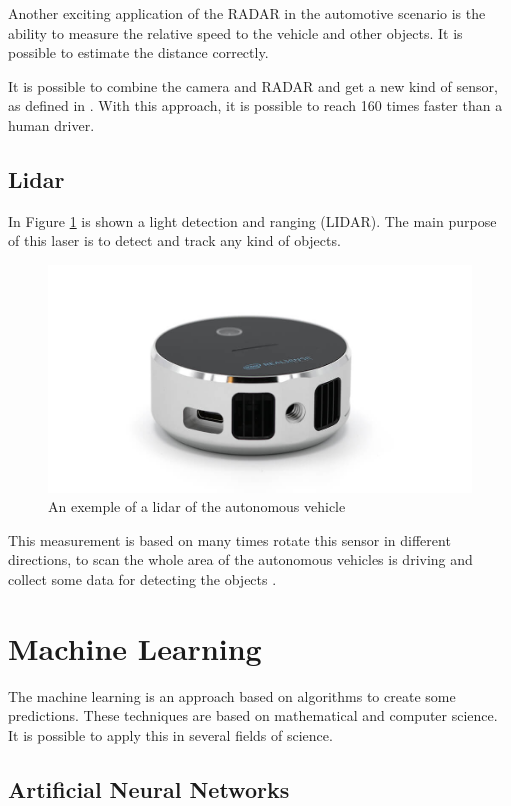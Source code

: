 Another exciting application of the RADAR in the automotive scenario is the ability to measure the relative speed to the vehicle and other objects. It is possible to estimate the distance \cite{stevenson2011long} correctly.

It is possible to combine the camera and RADAR and get a new kind of sensor, as defined in \cite{kamerad}. With this approach, it is possible to reach 160 times faster than a human driver.

\subsection{Lidar}
In Figure \ref{fig:lidar} is shown a light detection and ranging (LIDAR). The main purpose of this laser is to detect and track any kind of objects. 
\begin{figure}[H]
\centering
\includegraphics[width=\columnwidth]{imagens/lidar.jpg}
\caption{An exemple of a lidar of the autonomous vehicle}
\label{fig:lidar}
\end{figure}

This measurement is based on many times rotate this sensor in different directions, to scan the whole area of the autonomous vehicles is driving and collect some data for detecting the objects \cite{gao2018object}.

\section{Machine Learning}\label{ml-ai}
The machine learning is an approach based on algorithms to create some predictions. These techniques are based on mathematical and computer science. It is possible to apply this in several fields of science. 
\subsection{Artificial Neural Networks}

